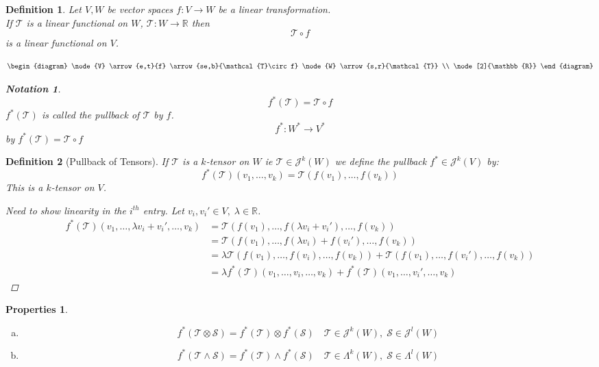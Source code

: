 \documentclass[11pt]{article}
\def\maj{\mathcal{J}}
\def\mat{\mathcal{T}}
\def\mas{\mathcal{S}}
\def\RR{\mathbb{R}}
\newtheorem{definition}{Definition}[section]
\newtheorem*{properties}{Properties}
\newtheorem*{notation}{Notation}
\begin{document}
\begin{definition}
Let $V,W$ be vector spaces $f:V\rightarrow W$ be a linear transformation. \\ If $\mat$ is a linear functional on $W$, $\mat : W\rightarrow \RR$ then \[\mat \circ f\] is a linear functional on $V$.

\[\begin{diagram}
\node{V} \arrow{e,t}{f}  \arrow{se,b}{\mat \circ f}
\node{W}  \arrow{s,r}{\mat} \\
 \node[2]{\RR}
\end{diagram}\]

\begin{notation}
\[f^{*}(\mat) = \mat \circ f\]
$f^{*}(\mat)$ is called the pullback of $\mat$ by $f$.
\[f^{*}:W^{*} \rightarrow V^{*}\]
by $f^{*}(\mat) = \mat \circ f$
\end{notation}

\end{definition}

\begin{definition}[Pullback of Tensors]
If $\mat$ is a $k$-tensor on $W$ ie $\mat \in \maj^k(W)$ we define the pullback $f^{*} \in \maj^k(V)$ by:
\[f^{*}(\mat)(v_1, \dots , v_k) = \mat(f(v_1), \dots , f(v_k))\]
This is a $k$-tensor on $V$.
\begin{proof}[Need to show linearity in the $i^{th}$ entry]
Let $v_i, v_i' \in V, \; \lambda \in \RR$.
\begin{align*}
f^{*}(\mat)(v_1,\dots,  \lambda v_i + v_i', \dots , v_k) &= \mat(f(v_1), \dots , f(\lambda v_i + v_i'), \dots , f(v_k))\\
&= \mat(f(v_1), \dots , f(\lambda v_i) + f(v_i'), \dots , f(v_k))\\
&= \lambda\mat(f(v_1), \dots , f( v_i), \dots , f(v_k))+ \mat(f(v_1), \dots , f(v_i'), \dots , f(v_k))\\
&=\lambda f^{*}(\mat)(v_1,\dots, v_i, \dots , v_k) + f^{*}(\mat)(v_1,\dots, v_i', \dots , v_k)
\end{align*}
\end{proof}
\end{definition}

\begin{properties}\quad\\
\begin{enumerate}[(a)]
\item \[ f^*(\mat \otimes \mas) = f^*(\mat)\otimes f^*(\mas) \quad \mat \in \maj^k(W), \; \mas \in \maj^l(W)\]
\item \[ f^*(\mat \wedge \mas) = f^*(\mat)\wedge f^*(\mas) \quad \mat \in \Lambda^k(W), \; \mas \in \Lambda^l(W)\]
\end{enumerate}
\end{properties}
\end{document}
